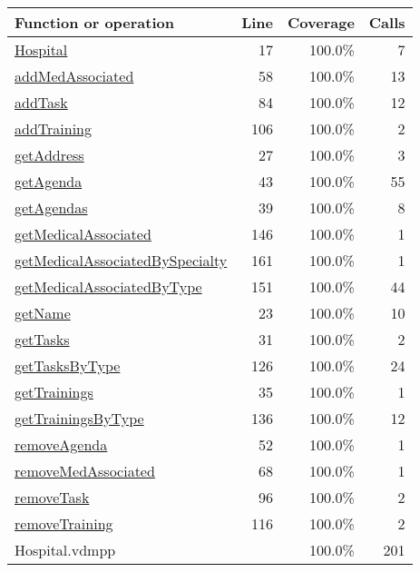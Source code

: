 \begin{longtable}{|l|r|r|r|}
\hline
Function or operation & Line & Coverage & Calls \\
\hline
\hline
\hyperref[Hospital:17]{Hospital} & 17&100.0\% & 7 \\
\hline
\hyperref[addMedAssociated:58]{addMedAssociated} & 58&100.0\% & 13 \\
\hline
\hyperref[addTask:84]{addTask} & 84&100.0\% & 12 \\
\hline
\hyperref[addTraining:106]{addTraining} & 106&100.0\% & 2 \\
\hline
\hyperref[getAddress:27]{getAddress} & 27&100.0\% & 3 \\
\hline
\hyperref[getAgenda:43]{getAgenda} & 43&100.0\% & 55 \\
\hline
\hyperref[getAgendas:39]{getAgendas} & 39&100.0\% & 8 \\
\hline
\hyperref[getMedicalAssociated:146]{getMedicalAssociated} & 146&100.0\% & 1 \\
\hline
\hyperref[getMedicalAssociatedBySpecialty:161]{getMedicalAssociatedBySpecialty} & 161&100.0\% & 1 \\
\hline
\hyperref[getMedicalAssociatedByType:151]{getMedicalAssociatedByType} & 151&100.0\% & 44 \\
\hline
\hyperref[getName:23]{getName} & 23&100.0\% & 10 \\
\hline
\hyperref[getTasks:31]{getTasks} & 31&100.0\% & 2 \\
\hline
\hyperref[getTasksByType:126]{getTasksByType} & 126&100.0\% & 24 \\
\hline
\hyperref[getTrainings:35]{getTrainings} & 35&100.0\% & 1 \\
\hline
\hyperref[getTrainingsByType:136]{getTrainingsByType} & 136&100.0\% & 12 \\
\hline
\hyperref[removeAgenda:52]{removeAgenda} & 52&100.0\% & 1 \\
\hline
\hyperref[removeMedAssociated:68]{removeMedAssociated} & 68&100.0\% & 1 \\
\hline
\hyperref[removeTask:96]{removeTask} & 96&100.0\% & 2 \\
\hline
\hyperref[removeTraining:116]{removeTraining} & 116&100.0\% & 2 \\
\hline
\hline
Hospital.vdmpp & & 100.0\% & 201 \\
\hline
\end{longtable}

